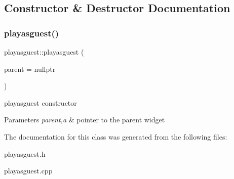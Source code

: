 \subsection{Constructor \& Destructor Documentation}
\mbox{\label{classplayasguest_ad5c1931e8115567e7f11452e88b73d06}} 
\subsubsection{\texorpdfstring{playasguest()}{playasguest()}}
{\footnotesize\ttfamily playasguest\+::playasguest (\begin{DoxyParamCaption}\item[{Q\+Widget $\ast$}]{parent = {\ttfamily nullptr} }\end{DoxyParamCaption})\hspace{0.3cm}{\ttfamily [explicit]}}



playasguest constructor 


\begin{DoxyParams}{Parameters}
{\em parent,a} & pointer to the parent widget \\
\hline
\end{DoxyParams}


The documentation for this class was generated from the following files\+:\begin{DoxyCompactItemize}
\item 
playasguest.\+h\item 
playasguest.\+cpp\end{DoxyCompactItemize}
